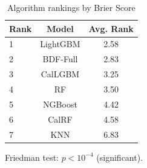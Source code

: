 \begin{table}[htbp]
\centering
\caption{Algorithm rankings by Brier Score}
\label{tab:rankings-brier}
\begin{tabular}{lcc}
\toprule
Rank & Model & Avg. Rank \\
\midrule
1 & LightGBM & 2.58 \\
2 & BDF-Full & 2.83 \\
3 & CalLGBM & 3.25 \\
4 & RF & 3.50 \\
5 & NGBoost & 4.42 \\
6 & CalRF & 4.58 \\
7 & KNN & 6.83 \\
\bottomrule
\end{tabular}
\par\smallskip\footnotesize{Friedman test: $p < 10^{-4}$ (significant).}
\end{table}
